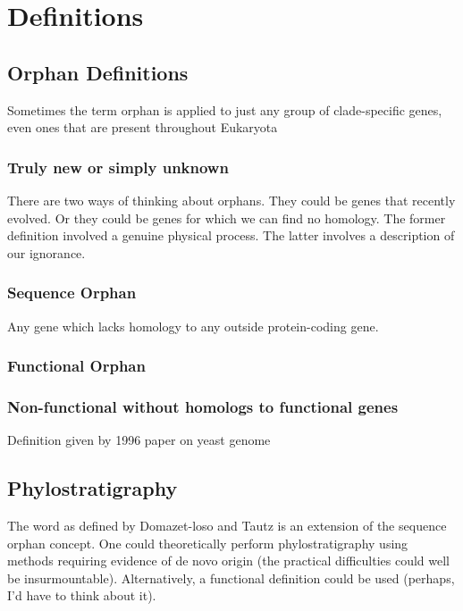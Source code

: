 \section{Definitions}

\subsection{Orphan Definitions}

    Sometimes the term orphan is applied to just any group of clade-specific genes, even ones that are present throughout Eukaryota \cite{bernardi_research_2015}

    \subsubsection{Truly new or simply unknown}
        There are two ways of thinking about orphans. They could be genes that
        recently evolved. Or they could be genes for which we can find no
        homology. The former definition involved a genuine physical process.
        The latter involves a description of our ignorance.

    \subsubsection{Sequence Orphan}
        Any gene which lacks homology to any outside protein-coding gene.

    \subsubsection{Functional Orphan}

    \subsubsection{Non-functional without homologs to functional genes}
        Definition given by 1996 paper on yeast genome \cite{dujon_yeast_1996}

\subsection{Phylostratigraphy}

    The word as defined by Domazet-loso and Tautz is an extension of the
    sequence orphan concept. One could theoretically perform phylostratigraphy
    using methods requiring evidence of de novo origin (the practical
    difficulties could well be insurmountable). Alternatively, a functional
    definition could be used (perhaps, I'd have to think about it).
